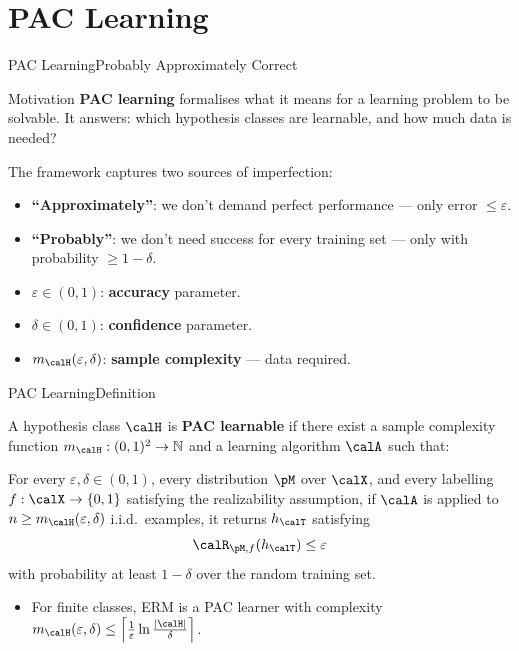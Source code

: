 \section{PAC Learning}

\begin{frame}{PAC Learning}{Probably Approximately Correct}
  \begin{block}{Motivation}
    \textcolor{AccentBlue}{\textbf{PAC learning}} formalises what it means for a learning
    problem to be solvable. It answers: which hypothesis classes are learnable, and how
    much data is needed?
  \end{block}
  \bigskip
  The framework captures two sources of imperfection:
  \begin{itemize}
    \item \textbf{``Approximately''}: we don't demand perfect performance — only error $\leq
          \varepsilon$.
    \item \textbf{``Probably''}: we don't need success for every training set — only with
          probability $\geq 1 - \delta$.
  \end{itemize}
  \bigskip
  \begin{itemize}
    \item $\varepsilon \in (0,1)$: \textbf{accuracy} parameter.
    \item $\delta \in (0,1)$: \textbf{confidence} parameter.
    \item $m_\calH(\varepsilon,\delta)$: \textbf{sample complexity} — data required.
  \end{itemize}
\end{frame}

\begin{frame}{PAC Learning}{Definition}
  \begin{mydefinition}
    A hypothesis class $\calH$ is \textcolor{AccentBlue}{\textbf{PAC learnable}} if there
    exist a sample complexity function $m_\calH:(0,1)^2\to\mathbb{N}$ and a learning
    algorithm $\calA$ such that:

    For every $\varepsilon,\delta\in(0,1)$, every distribution $\pM$ over $\calX$, and
    every labelling $f:\calX\to\{0,1\}$ satisfying the realizability assumption, if
    $\calA$ is applied to $n \geq m_\calH(\varepsilon,\delta)$ i.i.d.\ examples, it
    returns $h_\calT$ satisfying
    \[
      \calR_{\pM,f}(h_\calT) \leq \varepsilon
    \]
    with probability at least $1-\delta$ over the random training set.
  \end{mydefinition}
  \bigskip
  \begin{itemize}
    \item For finite classes, ERM is a PAC learner with complexity
          $m_\calH(\varepsilon,\delta) \leq \left\lceil\frac{1}{\varepsilon}
          \ln\frac{|\calH|}{\delta}\right\rceil$.
  \end{itemize}
\end{frame}

